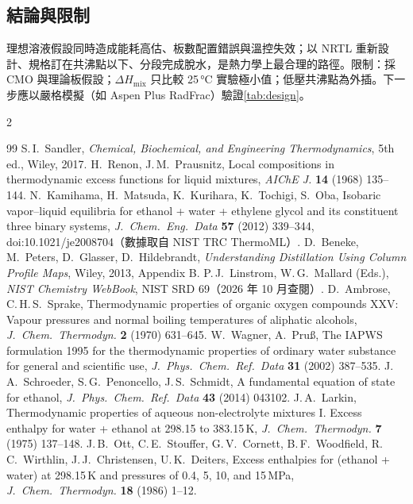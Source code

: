 \documentclass[UTF8,a4paper,11pt,fontset=none,zihao=-4]{ctexart}
\numberwithin{equation}{section}\renewcommand{\theequation}{\arabic{section}.\arabic{equation}}
\numberwithin{figure}{section}\renewcommand{\thefigure}{\arabic{section}.\arabic{figure}}
\numberwithin{table}{section}\renewcommand{\thetable}{\arabic{section}.\arabic{table}}
\begin{document}
\subsection{結論與限制}
理想溶液假設同時造成能耗高估、板數配置錯誤與溫控失效；以 NRTL 重新設計、規格訂在共沸點以下、分段完成脫水，是熱力學上最合理的路徑。限制：採 CMO 與理論板假設；$\Delta H_{\mathrm{mix}}$ 只比較 25\,°C 實驗極小值；低壓共沸點為外插。下一步應以嚴格模擬（如 Aspen Plus RadFrac）驗證\cref{tab:design}。

\begin{multicols}{2}
\begin{thebibliography}{99}\scriptsize
\setlength{\itemsep}{0pt}\setlength{\parsep}{0pt}
 S.\,I.\ Sandler, \textit{Chemical, Biochemical, and Engineering Thermodynamics}, 5th ed., Wiley, 2017.
 H.\ Renon, J.\,M.\ Prausnitz, Local compositions in thermodynamic excess functions for liquid mixtures, \textit{AIChE J.} \textbf{14} (1968) 135--144.
 N.\ Kamihama, H.\ Matsuda, K.\ Kurihara, K.\ Tochigi, S.\ Oba, Isobaric vapor--liquid equilibria for ethanol + water + ethylene glycol and its constituent three binary systems, \textit{J.\ Chem.\ Eng.\ Data} \textbf{57} (2012) 339--344, doi:10.1021/je2008704（數據取自 NIST TRC ThermoML）.
 D.\ Beneke, M.\ Peters, D.\ Glasser, D.\ Hildebrandt, \textit{Understanding Distillation Using Column Profile Maps}, Wiley, 2013, Appendix B.
 P.\,J.\ Linstrom, W.\,G.\ Mallard (Eds.), \textit{NIST Chemistry WebBook}, NIST SRD 69（2026 年 10 月查閱）.
 D.\ Ambrose, C.\,H.\,S.\ Sprake, Thermodynamic properties of organic oxygen compounds XXV: Vapour pressures and normal boiling temperatures of aliphatic alcohols, \textit{J.\ Chem.\ Thermodyn.} \textbf{2} (1970) 631--645.
 W.\ Wagner, A.\ Pru\ss, The IAPWS formulation 1995 for the thermodynamic properties of ordinary water substance for general and scientific use, \textit{J.\ Phys.\ Chem.\ Ref.\ Data} \textbf{31} (2002) 387--535.
 J.\,A.\ Schroeder, S.\,G.\ Penoncello, J.\,S.\ Schmidt, A fundamental equation of state for ethanol, \textit{J.\ Phys.\ Chem.\ Ref.\ Data} \textbf{43} (2014) 043102.
 J.\,A.\ Larkin, Thermodynamic properties of aqueous non-electrolyte mixtures I. Excess enthalpy for water + ethanol at 298.15 to 383.15\,K, \textit{J.\ Chem.\ Thermodyn.} \textbf{7} (1975) 137--148.
 J.\,B.\ Ott, C.\,E.\ Stouffer, G.\,V.\ Cornett, B.\,F.\ Woodfield, R.\,C.\ Wirthlin, J.\,J.\ Christensen, U.\,K.\ Deiters, Excess enthalpies for (ethanol + water) at 298.15\,K and pressures of 0.4, 5, 10, and 15\,MPa, \textit{J.\ Chem.\ Thermodyn.} \textbf{18} (1986) 1--12.

\end{thebibliography}
\end{multicols}
\end{document}

